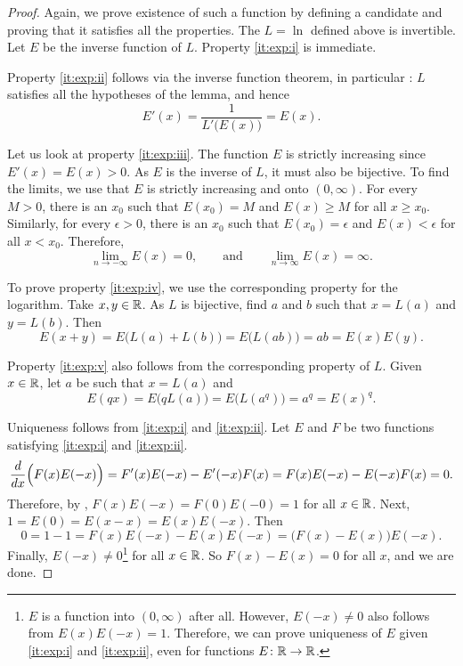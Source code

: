 \begin{proof}
Again, we prove existence of such a function by defining a candidate
and proving that it satisfies all the properties.
The $L = \ln$ defined above is invertible.  Let $E$ be the
inverse function of $L$.  Property \ref{it:exp:i} is immediate.

Property \ref{it:exp:ii} follows
via the inverse function theorem, in particular
:  $L$ satisfies
all the hypotheses of the lemma, and hence
\begin{equation*}
E'(x) = \frac{1}{L'\bigl(E(x)\bigr)} = E(x) .
\end{equation*}

Let us look at property \ref{it:exp:iii}.
The function $E$ is strictly increasing since 
$E'(x) = E(x) > 0$.  As $E$ is the inverse of $L$, it must also
be bijective.  
To find the limits, we use that 
$E$ is strictly increasing and onto $(0,\infty)$.
For every $M > 0$, there is an $x_0$ such that
$E(x_0) = M$ and $E(x) \geq M$ for all $x \geq x_0$.
Similarly, for every $\epsilon > 0$, there is
an $x_0$ such that $E(x_0) = \epsilon$ and
$E(x) < \epsilon$ for all $x < x_0$.
Therefore,
\begin{equation*}
\lim_{n\to -\infty} E(x) = 0 , \qquad \text{and} \qquad
\lim_{n\to \infty} E(x) = \infty .
\end{equation*}

To prove property \ref{it:exp:iv}, we use the corresponding
property for the logarithm.
Take $x, y \in {\mathbb{R}}$.
As $L$ is bijective, find $a$ and $b$ such that $x = L(a)$ and $y = L(b)$.  Then
\begin{equation*}
E(x+y) =
E\bigl(L(a)+L(b)\bigr) = 
E\bigl(L(ab)\bigr) = ab = E(x)E(y)  .
\end{equation*}

Property \ref{it:exp:v} also follows from the corresponding property of $L$.
Given $x \in {\mathbb{R}}$, let $a$ be such that $x = L(a)$ and
\begin{equation*}
E(qx) = E\bigl(qL(a)\bigr)
=
E\bigl(L(a^q)\bigr) = a^q = {E(x)}^q .
\end{equation*}

Uniqueness follows from
\ref{it:exp:i} and
\ref{it:exp:ii}.
Let $E$ and $F$
be two functions satisfying
\ref{it:exp:i} and \ref{it:exp:ii}.  
\begin{equation*}
\frac{d}{dx} \Bigl( F(x)E(-x) \Bigr)
=
F'(x)E(-x) - E'(-x)F(x)
=
F(x)E(-x) - E(-x)F(x) = 0 .
\end{equation*}
Therefore, by ,
$F(x)E(-x) = F(0)E(-0) = 1$ for all $x \in {\mathbb{R}}$.
Next, $1 = E(0) = E(x-x) = E(x)E(-x)$.
Then
\begin{equation*}
0 = 1-1 = F(x)E(-x) - E(x)E(-x) = \bigl(F(x)-E(x)\bigr) E(-x) .
\end{equation*}
Finally, $E(-x) \not= 0$\footnote{%
$E$ is a function into $(0,\infty)$ after all.
However, $E(-x) \neq 0$ also follows
from $E(x)E(-x) = 1$.  Therefore, we can prove uniqueness of $E$ 
given \ref{it:exp:i} and \ref{it:exp:ii}, even for functions $E \colon {\mathbb{R}}
\to {\mathbb{R}}$.}
for all $x \in {\mathbb{R}}$.
So
$F(x)-E(x) = 0$ for all $x$, and we are done.
\end{proof}

